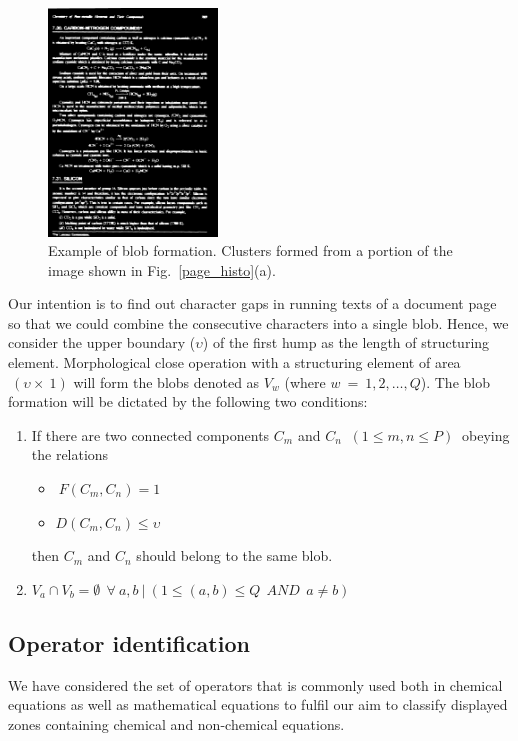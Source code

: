 \documentclass[oneside,a4paper,12pt]{book}
\begin{document}
\begin{figure}[h]\center\footnotesize
 \includegraphics[width=0.4\textwidth]{wordBlob.png} 
  \caption{Example of blob formation. Clusters formed from a portion of the image shown in
Fig.~\ref{page_histo}(a).}
 \label{word_blob}
\end{figure}

Our intention is to
find out character gaps in running texts of a document page so that we could
combine the consecutive characters into a single blob. Hence, we consider
the upper boundary ($\upsilon$) of the first hump as the length of structuring
element. Morphological
close operation with a structuring element of area
$\ (\upsilon \times \ 1)$ will form the blobs denoted as
$V_w$ (where $w\ =\ 1,2,\ldots ,Q$). The
blob formation will be dictated by the following
two conditions:
\begin{enumerate}
\item If there are two connected components $C_m$ and $C_n$ $\ (1\leq m,n\leq P)\ $
obeying the relations
\begin{itemize}
\item $ \ F(C_m, C_n) = 1 $
\item $ D(C_m, C_n) \leq \upsilon $
\end{itemize}
then $C_m$ and $C_n$ should belong to the same blob.
\item $ V_a \cap V_b = \emptyset \ \ \forall \ a,b \ | \ (1\leq (a,b) \leq Q \ \ AND \ \
 a \not= b)$
\end{enumerate}


\subsection {Operator  identification}
\label{op_id}
We have considered the set of operators that is commonly used both in  chemical equations as well as mathematical 
equations to fulfil our aim to classify displayed zones containing chemical and non-chemical equations.
\end{document}
